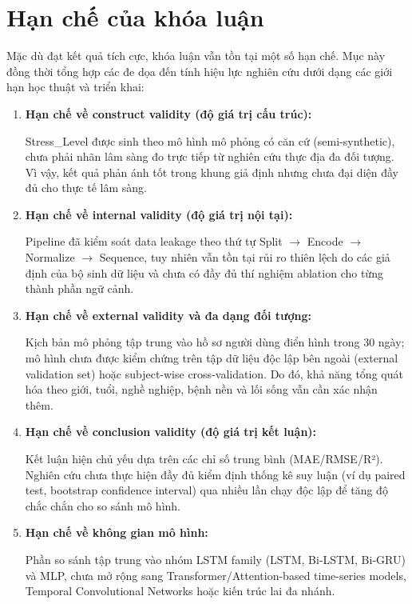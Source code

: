 \section{Hạn chế của khóa luận}
\label{sec:limitations}

Mặc dù đạt kết quả tích cực, khóa luận vẫn tồn tại một số hạn chế. Mục này đồng thời tổng hợp các đe dọa đến tính hiệu lực nghiên cứu dưới dạng các giới hạn học thuật và triển khai:

\begin{enumerate}
    \item \textbf{Hạn chế về construct validity (độ giá trị cấu trúc):}
    
    Stress\_Level được sinh theo mô hình mô phỏng có căn cứ (semi-synthetic), chưa phải nhãn lâm sàng đo trực tiếp từ nghiên cứu thực địa đa đối tượng. Vì vậy, kết quả phản ánh tốt trong khung giả định nhưng chưa đại diện đầy đủ cho thực tế lâm sàng.

    \item \textbf{Hạn chế về internal validity (độ giá trị nội tại):}
    
    Pipeline đã kiểm soát data leakage theo thứ tự Split $\to$ Encode $\to$ Normalize $\to$ Sequence, tuy nhiên vẫn tồn tại rủi ro thiên lệch do các giả định của bộ sinh dữ liệu và chưa có đầy đủ thí nghiệm ablation cho từng thành phần ngữ cảnh.

    \item \textbf{Hạn chế về external validity và đa dạng đối tượng:}
    
    Kịch bản mô phỏng tập trung vào hồ sơ người dùng điển hình trong 30 ngày; mô hình chưa được kiểm chứng trên tập dữ liệu độc lập bên ngoài (external validation set) hoặc subject-wise cross-validation. Do đó, khả năng tổng quát hóa theo giới, tuổi, nghề nghiệp, bệnh nền và lối sống vẫn cần xác nhận thêm.

    \item \textbf{Hạn chế về conclusion validity (độ giá trị kết luận):}
    
    Kết luận hiện chủ yếu dựa trên các chỉ số trung bình (MAE/RMSE/R²). Nghiên cứu chưa thực hiện đầy đủ kiểm định thống kê suy luận (ví dụ paired test, bootstrap confidence interval) qua nhiều lần chạy độc lập để tăng độ chắc chắn cho so sánh mô hình.

    \item \textbf{Hạn chế về không gian mô hình:}
    
    Phần so sánh tập trung vào nhóm LSTM family (LSTM, Bi-LSTM, Bi-GRU) và MLP, chưa mở rộng sang Transformer/Attention-based time-series models, Temporal Convolutional Networks hoặc kiến trúc lai đa nhánh.


\end{enumerate}
